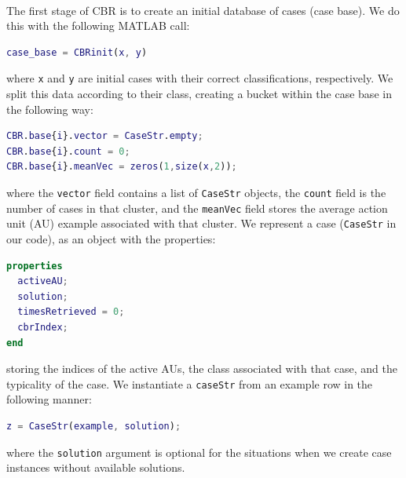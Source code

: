 \documentclass[a4paper,12pt,oneside,final]{report}
\newenvironment{changemargin}[2]{\begin{list}{}{%
\setlength{\topsep}{0pt}%
\setlength{\leftmargin}{0pt}%
\setlength{\rightmargin}{0pt}%
\setlength{\listparindent}{\parindent}%
\setlength{\itemindent}{\parindent}%
\setlength{\parsep}{0pt plus 1pt}%
\addtolength{\leftmargin}{#1}%
\addtolength{\rightmargin}{#2}%
}\item }{\end{list}}
\begin{document}
\paragraph{}
The first stage of CBR is to create an initial database of cases (case base).  We do this with the following MATLAB call:
\begin{changemargin}{-5mm}{-5mm}
\begin{lstlisting}[language=Matlab, frame=single]
case_base = CBRinit(x, y)
\end{lstlisting}
\end{changemargin}
where \verb+x+ and \verb+y+ are initial cases with their correct classifications, respectively.  We split this data according to their class, creating a bucket within the case base in the following way:
\begin{changemargin}{-5mm}{-5mm}
\begin{lstlisting}[language=Matlab, frame=single]
CBR.base{i}.vector = CaseStr.empty;
CBR.base{i}.count = 0;
CBR.base{i}.meanVec = zeros(1,size(x,2));
\end{lstlisting}
\end{changemargin}
where the \verb+vector+ field contains a list of \verb+CaseStr+ objects, the \verb+count+ field is the number of cases in that cluster, and the \verb+meanVec+ field stores the average action unit (AU) example associated with that cluster.  
We represent a case (\verb+CaseStr+ in our code), as an object with the properties:
\begin{changemargin}{-5mm}{-5mm}
\begin{lstlisting}[language=Matlab, frame=single]
properties
  activeAU;
  solution;
  timesRetrieved = 0;
  cbrIndex;
end
\end{lstlisting}
\end{changemargin}
storing the indices of the active AUs, the class associated with that case, and the typicality of the case.  We instantiate a \verb+caseStr+ from an example row in the following manner:
\begin{changemargin}{-5mm}{-5mm}
\begin{lstlisting}[language=Matlab, frame=single]
z = CaseStr(example, solution);
\end{lstlisting}
\end{changemargin}
where the \verb+solution+ argument is optional for the situations when we create case instances without available solutions.
\end{document}

